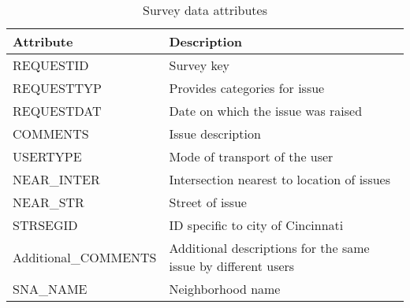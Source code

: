 \documentclass{llncs}
\begin{document}
\FloatBarrier
\begin{table}
\begin{center}
\caption{Survey data attributes}
\begin{tabular}{l p{80mm}}
\hline
\rule{0pt}{12pt}
Attribute & Description\\[2pt]
\hline
REQUESTID	&	Survey key\\
REQUESTTYP	&	Provides categories for issue	\\
REQUESTDAT	&	Date on which the issue was raised	\\
COMMENTS	&	Issue description	\\
USERTYPE	&	Mode of transport of the user	\\
NEAR_INTER	&	Intersection nearest to location of issues	\\
NEAR_STR	&	Street of issue	\\
STRSEGID	&	ID specific to city of Cincinnati\\
Additional_COMMENTS	&  Additional descriptions for the same issue by different users	\\
SNA_NAME & Neighborhood name	\\[2pt]
\hline
\end{tabular}
\end{center}	
\end{table}
\FloatBarrier	
%
\FloatBarrier
\end{document}
